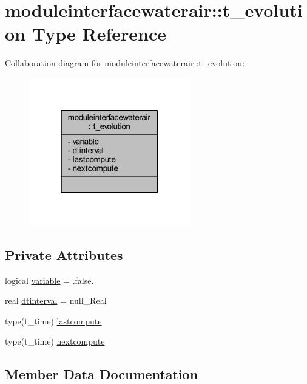 \hypertarget{structmoduleinterfacewaterair_1_1t__evolution}{}\section{moduleinterfacewaterair\+:\+:t\+\_\+evolution Type Reference}
\label{structmoduleinterfacewaterair_1_1t__evolution}


Collaboration diagram for moduleinterfacewaterair\+:\+:t\+\_\+evolution\+:\nopagebreak
\begin{figure}[H]
\begin{center}
\leavevmode
\includegraphics[width=199pt]{structmoduleinterfacewaterair_1_1t__evolution__coll__graph}
\end{center}
\end{figure}
\subsection*{Private Attributes}
\begin{DoxyCompactItemize}
\item 
logical \mbox{\hyperlink{structmoduleinterfacewaterair_1_1t__evolution_aa41058e255535e168eade39cf30c59d9}{variable}} = .false.
\item 
real \mbox{\hyperlink{structmoduleinterfacewaterair_1_1t__evolution_a7832ca63fe90d0cf027eda9bf2ace0d1}{dtinterval}} = null\+\_\+\+Real
\item 
type(t\+\_\+time) \mbox{\hyperlink{structmoduleinterfacewaterair_1_1t__evolution_a5c8883e0e49dce43f4cbb3ee0c9bce26}{lastcompute}}
\item 
type(t\+\_\+time) \mbox{\hyperlink{structmoduleinterfacewaterair_1_1t__evolution_a7ea10f7b1d53b5398b98d5be95f83af7}{nextcompute}}
\end{DoxyCompactItemize}


\subsection{Member Data Documentation}
\mbox{\label{structmoduleinterfacewaterair_1_1t__evolution_a7832ca63fe90d0cf027eda9bf2ace0d1}} 
